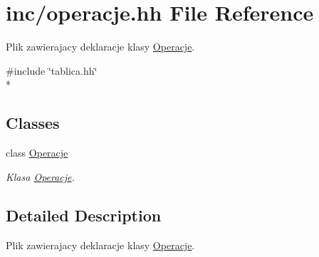 \hypertarget{operacje_8hh}{\section{inc/operacje.hh File Reference}
\label{operacje_8hh}
}


Plik zawierajacy deklaracje klasy \hyperlink{class_operacje}{Operacje}.  


{\ttfamily \#include \char`\"{}tablica.\-hh\char`\"{}}\\*
\subsection*{Classes}
\begin{DoxyCompactItemize}
\item 
class \hyperlink{class_operacje}{Operacje}
\begin{DoxyCompactList}\small\item\em Klasa \hyperlink{class_operacje}{Operacje}. \end{DoxyCompactList}\end{DoxyCompactItemize}


\subsection{Detailed Description}
Plik zawierajacy deklaracje klasy \hyperlink{class_operacje}{Operacje}. 